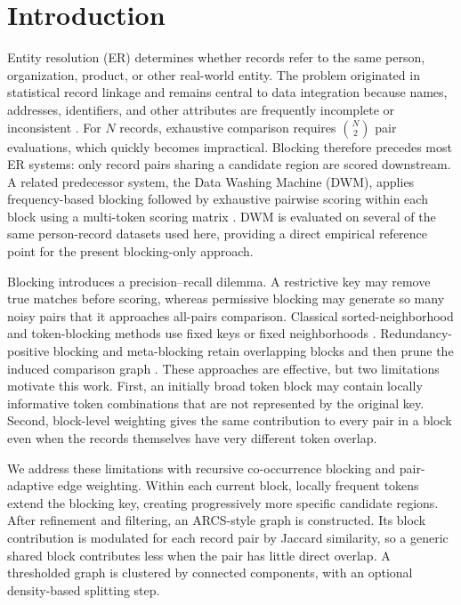 \documentclass[conference]{IEEEtran}
\begin{document}
\section{Introduction}
Entity resolution (ER) determines whether records refer to the same person, organization, product, or other real-world entity. The problem originated in statistical record linkage and remains central to data integration because names, addresses, identifiers, and other attributes are frequently incomplete or inconsistent \cite{newcombe1959,fellegi1969,christen2012}. For $N$ records, exhaustive comparison requires $\binom{N}{2}$ pair evaluations, which quickly becomes impractical. Blocking therefore precedes most ER systems: only record pairs sharing a candidate region are scored downstream. A related predecessor system, the Data Washing Machine (DWM), applies frequency-based blocking followed by exhaustive pairwise scoring within each block using a multi-token scoring matrix \cite{talburt2020}. DWM is evaluated on several of the same person-record datasets used here, providing a direct empirical reference point for the present blocking-only approach.

Blocking introduces a precision--recall dilemma. A restrictive key may remove true matches before scoring, whereas permissive blocking may generate so many noisy pairs that it approaches all-pairs comparison. Classical sorted-neighborhood and token-blocking methods use fixed keys or fixed neighborhoods \cite{hernandez1995,yan2007,draisbach2011}. Redundancy-positive blocking and meta-blocking retain overlapping blocks and then prune the induced comparison graph \cite{papadakis2014,papadakis2020}. These approaches are effective, but two limitations motivate this work. First, an initially broad token block may contain locally informative token combinations that are not represented by the original key. Second, block-level weighting gives the same contribution to every pair in a block even when the records themselves have very different token overlap.

We address these limitations with recursive co-occurrence blocking and pair-adaptive edge weighting. Within each current block, locally frequent tokens extend the blocking key, creating progressively more specific candidate regions. After refinement and filtering, an ARCS-style graph is constructed. Its block contribution is modulated for each record pair by Jaccard similarity, so a generic shared block contributes less when the pair has little direct overlap. A thresholded graph is clustered by connected components, with an optional density-based splitting step.
\end{document}
